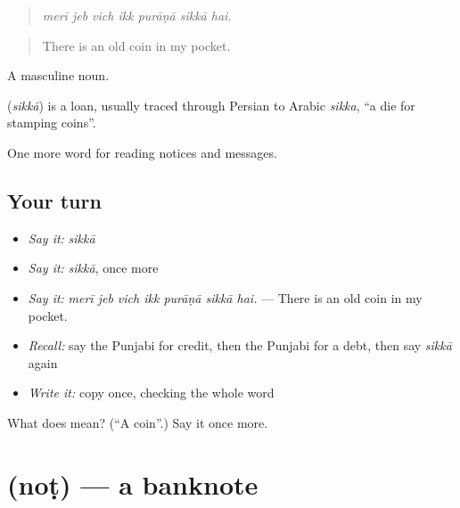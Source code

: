 \begin{quote}
      
\end{quote}

\begin{quote}
\emph{merī jeb vich ikk purāṇā sikkā hai.}
\end{quote}

\begin{quote}
There is an old coin in my pocket.
\end{quote}

A masculine noun.

\begin{cousinweb}
\textbf{} (\emph{sikkā}) is a loan, usually traced through Persian to Arabic \emph{sikka}, \textquotedblleft{}a die for stamping coins\textquotedblright{}.
\end{cousinweb}

\begin{grammarlens}[title={What you've built}]
One more word for reading notices and messages.
\end{grammarlens}

\subsection*{Your turn}
\begin{itemize}
\raggedright
  \item \emph{Say it:} \emph{sikkā}
  \item \emph{Say it:} \emph{sikkā}, once more
  \item \emph{Say it:} \emph{merī jeb vich ikk purāṇā sikkā hai.} — There is an old coin in my pocket.
  \item \emph{Recall:} say the Punjabi for credit, then the Punjabi for a debt, then say \emph{sikkā} again
  \item \emph{Write it:} copy \textbf{} once, checking the whole word
\end{itemize}

\begin{tcolorbox}[breakable,colback=teal!4,colframe=teal!35!black,title={Before you move on}]
What does  mean? (\textquotedblleft{}A coin\textquotedblright{}.) Say it once more.
\end{tcolorbox}
\section[\texorpdfstring{\pa{ਨੋਟ} (noṭ)}{ਨੋਟ (noṭ)}]{ (noṭ) — a banknote}

